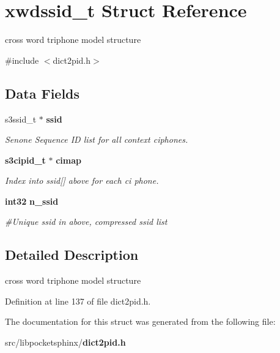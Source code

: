 \section{xwdssid\-\_\-t \-Struct \-Reference}
\label{structxwdssid__t}


cross word triphone model structure  




{\ttfamily \#include $<$dict2pid.\-h$>$}

\subsection*{\-Data \-Fields}
\begin{DoxyCompactItemize}
\item 
s3ssid\-\_\-t $\ast$ {\bf ssid}\label{structxwdssid__t_adbeeda6e94a51f08626c13414cdad6a8}

\begin{DoxyCompactList}\small\item\em \-Senone \-Sequence \-I\-D list for all context ciphones. \end{DoxyCompactList}\item 
{\bf s3cipid\-\_\-t} $\ast$ {\bf cimap}\label{structxwdssid__t_a502f9241a70383aa260d3390e4ff58fb}

\begin{DoxyCompactList}\small\item\em \-Index into ssid[] above for each ci phone. \end{DoxyCompactList}\item 
{\bf int32} {\bf n\-\_\-ssid}\label{structxwdssid__t_ab4443c642c5aff57c35abed070112d6e}

\begin{DoxyCompactList}\small\item\em \#\-Unique ssid in above, compressed ssid list \end{DoxyCompactList}\end{DoxyCompactItemize}


\subsection{\-Detailed \-Description}
cross word triphone model structure 

\-Definition at line 137 of file dict2pid.\-h.



\-The documentation for this struct was generated from the following file\-:\begin{DoxyCompactItemize}
\item 
src/libpocketsphinx/{\bf dict2pid.\-h}\end{DoxyCompactItemize}
